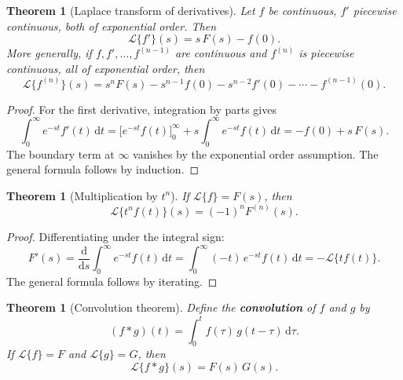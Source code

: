 \documentclass[12pt,a4paper,openany]{book}
\theoremstyle{definition}
\theoremstyle{plain}
\newtheorem{theorem}[definition]{Theorem}
\theoremstyle{remark}
\newcommand{\dd}{\mathrm{d}}
\begin{document}
\begin{theorem}[Laplace transform of derivatives]
\label{thm:laplace-deriv}
Let \(f\) be continuous, \(f'\) piecewise continuous, both of exponential order.
Then
\begin{equation}\label{eq:laplace-deriv1}
  \mathcal{L}\{f'\}(s) = s\,F(s) - f(0).
\end{equation}
More generally, if \(f,f',\ldots,f^{(n-1)}\) are continuous and
\(f^{(n)}\) is piecewise continuous, all of exponential order, then
\begin{equation}\label{eq:laplace-deriv-n}
  \mathcal{L}\{f^{(n)}\}(s) = s^n F(s) - s^{n-1}f(0) - s^{n-2}f'(0)
  - \cdots - f^{(n-1)}(0).
\end{equation}
\end{theorem}

\begin{proof}
For the first derivative, integration by parts gives
\[
  \int_0^\infty e^{-st}f'(t)\,\dd t
  = \bigl[e^{-st}f(t)\bigr]_0^\infty + s\int_0^\infty e^{-st}f(t)\,\dd t
  = -f(0) + s\,F(s).
\]
The boundary term at \(\infty\) vanishes by the exponential order assumption.
The general formula follows by induction.
\end{proof}

\begin{theorem}[Multiplication by \(t^n\)]
\label{thm:laplace-mult-t}
If \(\mathcal{L}\{f\}=F(s)\), then
\begin{equation}\label{eq:laplace-mult-t}
  \mathcal{L}\{t^n f(t)\}(s) = (-1)^n F^{(n)}(s).
\end{equation}
\end{theorem}

\begin{proof}
Differentiating under the integral sign:
\[
  F'(s) = \frac{\dd}{\dd s}\int_0^\infty e^{-st}f(t)\,\dd t
  = \int_0^\infty (-t)\,e^{-st}f(t)\,\dd t
  = -\mathcal{L}\{tf(t)\}.
\]
The general formula follows by iterating.
\end{proof}

\begin{theorem}[Convolution theorem]
\label{thm:convolution}
Define the \textbf{convolution} of \(f\) and \(g\) by
\begin{equation}\label{eq:convolution-def}
  (f*g)(t) = \int_0^t f(\tau)\,g(t-\tau)\,\dd\tau.
\end{equation}
If \(\mathcal{L}\{f\}=F\) and \(\mathcal{L}\{g\}=G\), then
\begin{equation}\label{eq:convolution-thm}
  \mathcal{L}\{f*g\}(s) = F(s)\,G(s).
\end{equation}
\end{theorem}
\end{document}
